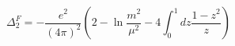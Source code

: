 \begin{equation}
  \Delta_{2}^{F}=-\frac{e^{2}}{(4\pi)^{2}}\left(2-\ln\frac{m^{2}}{\mu^{2}}-4\int_{0}^{1}dz\frac{1-z^{2}}{z}\right)
  \end{equation}

